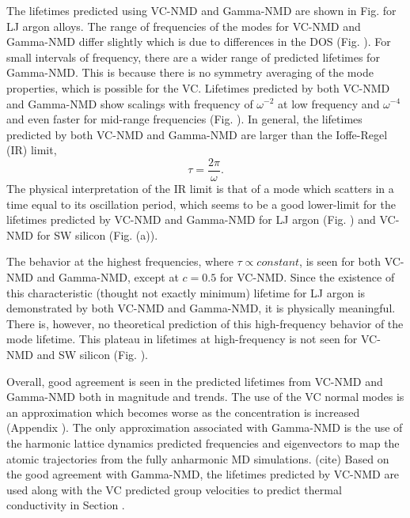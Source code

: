 \documentclass[aps,prb,twocolumn,superscriptaddress,amsmath,amssymb,floatfix]{revtex4}
\begin{document}
The lifetimes predicted using VC-NMD and Gamma-NMD  
are shown in Fig. for LJ argon alloys. 
The range of frequencies of the modes for 
VC-NMD and Gamma-NMD differ slightly  
which is due to differences in the DOS (Fig. ). 
For small intervals of frequency, there are a wider range of 
predicted lifetimes for Gamma-NMD. This is because there is no symmetry 
averaging of the mode properties, which is possible for the VC.
Lifetimes predicted by both VC-NMD and Gamma-NMD show scalings with 
frequency of $\omega^{-2}$ at low frequency and $\omega^{-4}$ and 
even faster for mid-range frequencies (Fig. ). 
In general, the lifetimes predicted by both VC-NMD and Gamma-NMD  
are larger than the Ioffe-Regel (IR) limit,
\cite{taraskin_determination_1999} 
\begin{equation}\label{EQ:IR}
\tau = \frac{2\pi}{\omega}.
\end{equation}
The physical interpretation of the IR limit is that of a mode which 
scatters in a time equal to its oscillation period, which seems to 
be a good lower-limit for the lifetimes predicted by VC-NMD and Gamma-NMD 
for LJ argon (Fig. ) and VC-NMD for SW silicon (Fig. (a)). 

The behavior at the highest frequencies, 
where $\tau \propto constant$, is seen for both VC-NMD and Gamma-NMD, 
except at $c=0.5$ for VC-NMD.  
Since the existence of this 
characteristic (thought not exactly minimum) lifetime for LJ argon is 
demonstrated by both VC-NMD and Gamma-NMD, it is physically 
meaningful. There is, however, no theoretical 
prediction of this high-frequency behavior of the mode lifetime.
\cite{kittel_interpretation_1949,cahill_lattice_1988,
graebner_phonon_1986} This 
plateau in lifetimes at high-frequency is not seen for VC-NMD and SW 
silicon (Fig. ). 

Overall, good agreement is seen in the predicted lifetimes from VC-NMD and 
Gamma-NMD both in magnitude and trends. The use of the VC normal modes 
is an approximation which becomes worse as the concentration is increased 
(Appendix ). The only approximation associated with Gamma-NMD is the use  
of the harmonic lattice dynamics predicted frequencies and eigenvectors 
to map the atomic trajectories from the fully anharmonic MD simulations.
(cite) 
Based on the good agreement with Gamma-NMD, the 
lifetimes predicted by VC-NMD are used along with the VC predicted 
group velocities to 
predict thermal conductivity in Section . 
\end{document}
